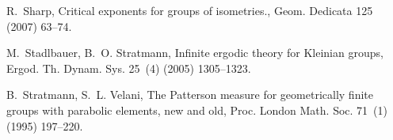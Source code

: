 \documentclass[10pt]{article}
\theoremstyle{mystyle}
\newcommand{\1}{\mathbf{1}}
\begin{document}
\begin{thebibliography}{10}
R.~Sharp, {Critical exponents for groups of isometries.}, Geom. Dedicata 125
  (2007) 63--74.

M.~Stadlbauer, B.~O. Stratmann,
  {Infinite ergodic theory for {K}leinian groups}, Ergod. Th. Dynam. Sys. 25~(4) (2005)
  1305--1323.

B.~Stratmann, S.~L. Velani,
  {The Patterson measure for geometrically finite groups with parabolic elements,
  new and old}, Proc. London Math. Soc. 71~(1) (1995) 197--220.

\end{thebibliography}
\end{document}
